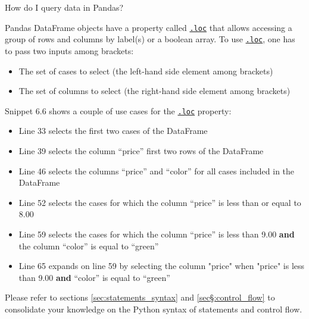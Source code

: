 \documentclass[a4paper,11pt]{book}
\newcommand{\question}[1]{%
    \begin{tcolorbox}[colback=comp_c!10,colframe=comp_c,sidebyside align=top,width=\linewidth,before skip=1ex]
        #1
    \end{tcolorbox}
    \switchcolumn%
}
\newcommand{\note}[1]{%
    \begin{tcolorbox}[colback=white!0,colframe=white!10,width=\linewidth,before skip=1ex]
        #1
    \end{tcolorbox}
}
\begin{document}
\begin{paracol}{2}
	\question{\raggedright How do I query data in Pandas?}
	\note{Pandas DataFrame objects have a property called \href{https://pandas.pydata.org/docs/reference/api/pandas.DataFrame.loc.html?highlight=loc#pandas.DataFrame.loc}{\texttt{.loc}} that allows accessing a group of rows and columns by label(s) or a boolean array. To use \href{https://pandas.pydata.org/docs/reference/api/pandas.DataFrame.loc.html?highlight=loc#pandas.DataFrame.loc}{\texttt{.loc}}, one has to pass two inputs among brackets:
	
	\begin{itemize}
		\item The set of cases to select (the left-hand side element among brackets)
		\item The set of columns to select (the right-hand side element among brackets)
	\end{itemize}

	\quad Snippet 6.6 shows a couple of use cases for the \href{https://pandas.pydata.org/docs/reference/api/pandas.DataFrame.loc.html?highlight=loc#pandas.DataFrame.loc}{\texttt{.loc}} property:

	\begin{itemize}
		\item Line 33 selects the first two cases of the DataFrame
		\item Line 39 selects the column ``price'' first two rows of the DataFrame
		\item Line 46 selects  the columns ``price'' and ``color'' for all cases included in the DataFrame
		\item Line 52 selects the cases for which the column ``price'' is less than or equal to 8.00
		\item Line 59 selects the cases for which the column ``price'' is less than 9.00 \textbf{and} the column ``color'' is equal to ``green''
		\item Line 65 expands on line 59 by selecting the column "price" when "price" is less than 9.00 \textbf{and} ``color'' is equal to ``green''
	\end{itemize}

	\quad Please refer to sections \ref{sec:statements_syntax} and \ref{sec§:control_flow} to consolidate your knowledge on the Python syntax of statements and control flow.
	}
\end{paracol}
\end{document}
